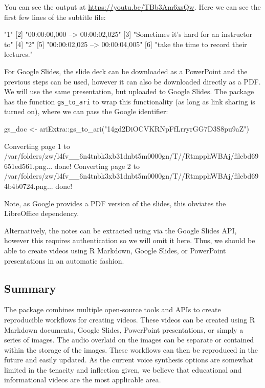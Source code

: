 You can see the output at \url{https://youtu.be/TBb3Am6xsQw}. Here we
can see the first few lines of the subtitle file:

\begin{Schunk}
\begin{Soutput}
[1] "1"                                       
[2] "00:00:00,000 --> 00:00:02,025"           
[3] "Sometimes it’s hard for an instructor to"
[4] "2"                                       
[5] "00:00:02,025 --> 00:00:04,005"           
[6] "take the time to record their lectures." 
\end{Soutput}
\end{Schunk}

For Google Slides, the slide deck can be downloaded as a PowerPoint and
the previous steps can be used, however it can also be downloaded
directly as a PDF. We will use the same presentation, but uploaded to
Google Slides. The  package has the function
\texttt{gs\_to\_ari} to wrap this functionality (as long as link sharing
is turned on), where we can pass the Google identifier:

\begin{Schunk}
\begin{Sinput}
gs_doc <- ariExtra::gs_to_ari("14gd2DiOCVKRNpFfLrryrGG7D3S8pu9aZ")
\end{Sinput}
\begin{Soutput}
Converting page 1 to
/var/folders/zw/l4fv__6n4tnbk3xb31dnbt5m0000gn/T//RtmpphWBAj/filebd69651ed561.png...
done!
Converting page 2 to
/var/folders/zw/l4fv__6n4tnbk3xb31dnbt5m0000gn/T//RtmpphWBAj/filebd694b4b0724.png...
done!
\end{Soutput}
\end{Schunk}

Note, as Google provides a PDF version of the slides, this obviates the
LibreOffice dependency.

Alternatively, the notes can be extracted using  via
the Google Slides API, however this requires authentication so we will
omit it here. Thus, we should be able to create videos using R Markdown,
Google Slides, or PowerPoint presentations in an automatic fashion.

\hypertarget{summary}{%
\subsection{Summary}\label{summary}}

The  package combines multiple open-source tools and APIs to
create reproducible workflows for creating videos. These videos can be
created using R Markdown documents, Google Slides, PowerPoint
presentations, or simply a series of images. The audio overlaid on the
images can be separate or contained within the storage of the images.
These workflows can then be reproduced in the future and easily updated.
As the current voice synthesis options are somewhat limited in the
tenacity and inflection given, we believe that educational and
informational videos are the most applicable area.

